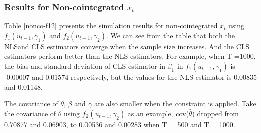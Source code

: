 \documentclass[a4paper,12pt,times,numbered,print,index]{report}
\numberwithin{equation}{section}
\begin{document}
\subsubsection{Results for Non-cointegrated $x_t$}

Table \ref{nonco-f12} presents the simulation results for non-cointegrated $x_t$ using $f_1 (u_{t-1}, \gamma_1)$ and $f_2 (u_{t-1}, \gamma_2)$. We can see from the table that both the NLSand CLS estimators converge when the sample size increases. And the CLS estimators perform better than the NLS estimators. For example, when T =1000, the bias and standard deviation of CLS estimator in $\beta_{1}$ in $f_1 (u_{t-1}, \gamma_1)$ is -0.00007 and 0.01574 respectively, but the values for the NLS estimator is 0.00835 and 0.01148. 

The covariance of $\theta$, $\beta$ and $\gamma$ are also smaller when the constraint is applied. Take the covariance of $\theta$ using  $f_2 (u_{t-1}, \gamma_2)$ as an example, cov($\hat{\theta}$) dropped from 0.70877 and 0.06903, to 0.00536 and 0.00283 when T = 500 and T = 1000.
\end{document}
